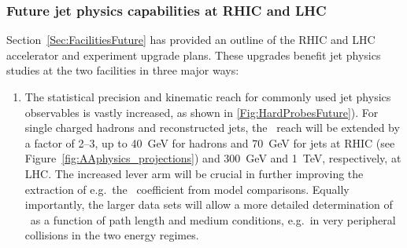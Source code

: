\subsubsection{Future jet physics capabilities at RHIC and LHC}
\label{Sec:FutureJetCapabilities}

Section~\ref{Sec:FacilitiesFuture} has provided an outline of the RHIC and LHC
accelerator and experiment upgrade plans. These upgrades benefit jet physics studies
at the two facilities in three major ways:
\begin{enumerate}
\item The statistical precision and kinematic reach for commonly used jet physics observables
is vastly increased, as shown in \ref{Fig:HardProbesFuture}). For single charged hadrons and reconstructed jets, the \pT\ reach will be 
extended by a factor of 2--3, up to 40~GeV for hadrons and 70~GeV for jets at RHIC (see Figure\ \ref{fig:AAphysics_projections}) and 
300~GeV and 1~TeV, respectively, at LHC. The increased lever arm will be crucial in further improving
the extraction of e.g.\ the \qhat\ coefficient from model comparisons. Equally importantly, 
the larger data sets will allow a more detailed determination of \qhat\ as a function
of path length and medium conditions, e.g.\ in very peripheral collisions in the two 
energy regimes.


\end{enumerate}
